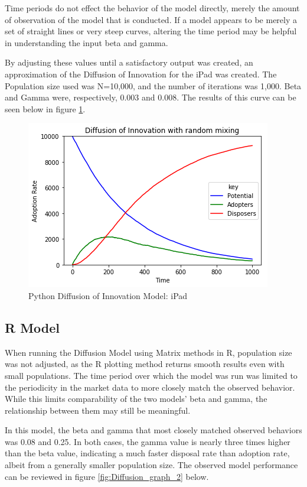 \documentclass[11pt]{article}
\begin{document}
Time periods do not effect the behavior of the model directly, merely the amount of observation of the model that is conducted. If a model appears to be merely a set of straight lines or very steep curves, altering the time period may be helpful in understanding the input beta and gamma.

By adjusting these values until a satisfactory output was created, an approximation of the Diffusion of Innovation for the iPad was created. The Population size used was N=10,000, and the number of iterations was 1,000. Beta and Gamma were, respectively, 0.003 and 0.008. The results of this curve can be seen below in figure \ref{fig:Diffusion_graph}.

\begin{figure}[h!]
	\centering
	\includegraphics[width=0.7\linewidth]{Diffusion_graph.png}
	\caption{Python Diffusion of Innovation Model: iPad}
	\label{fig:Diffusion_graph}
\end{figure}


\subsection{R Model}

When running the Diffusion Model using Matrix methods in R, population size was not adjusted, as the R plotting method returns smooth results even with small populations. The time period over which the model was run was limited to the periodicity in the market data to more closely match the observed behavior. While this limits comparability of the two models' beta and gamma, the relationship between them may still be meaningful. 

In this model, the beta and gamma that most closely matched observed behaviors was 0.08 and 0.25. In both cases, the gamma value is nearly three times higher than the beta value, indicating a much faster disposal rate than adoption rate, albeit from a generally smaller population size. The observed model performance can be reviewed in figure  \ref{fig:Diffusion_graph_2} below.
\end{document}
